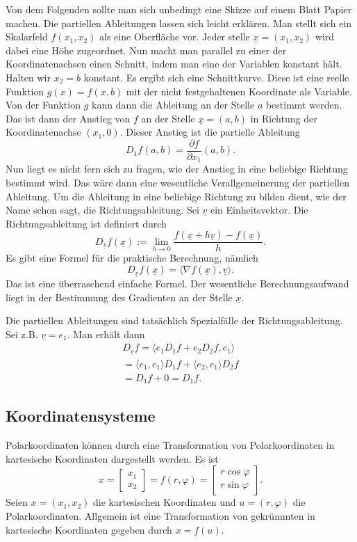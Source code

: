 \documentclass[a4paper,10pt,fleqn,twocolumn,twoside]{article}
\begin{document}
Von dem Folgenden sollte man sich unbedingt eine Skizze auf einem
Blatt Papier machen. Die partiellen Ableitungen lassen sich leicht
erklären. Man stellt sich ein Skalarfeld \(f(x_1,x_2)\) als eine
Oberfläche vor. Jeder stelle \(\underline x=(x_1,x_2)\) wird dabei
eine Höhe zugeordnet. Nun macht man parallel zu einer der
Koordinatenachsen einen Schnitt, indem man eine der Variablen
konstant hält. Halten wir \(x_2=b\) konstant. Es ergibt sich
eine Schnittkurve. Diese ist eine reelle Funktion \(g(x)=f(x,b)\)
mit der nicht festgehaltenen Koordinate als Variable.
Von der Funktion \(g\) kann dann die Ableitung an der Stelle \(a\)
bestimmt werden. Das ist dann der Anstieg von \(f\) an der Stelle
\(\underline x=(a,b)\) in Richtung der Koordinatenachse \((x_1,0)\).
Dieser Anstieg ist die partielle Ableitung
\[D_1 f(a,b) = \frac{\partial f}{\partial x_1}(a,b).\]
%
Nun liegt es nicht fern sich zu fragen, wie der Anstieg in eine
beliebige Richtung bestimmt wird. Das wäre dann eine wesentliche
Verallgemeinerung der partiellen Ableitung.
%
Um die Ableitung in eine beliebige Richtung zu bilden dient, wie der
Name schon sagt, die Richtungsableitung. Sei \(\underline v\)
ein Einheitsvektor. Die Richtungsableitung ist definiert durch
\[D_{\underline v} f(\underline x) := \lim_{h\rightarrow 0}
\frac{f(\underline x+h\underline v)-f(\underline x)}{h}.\]
Es gibt eine Formel für die praktische Berechnung, nämlich
\[D_{\underline v} f(\underline x)
= \langle\nabla f(\underline x),\underline v\rangle.\]
Das ist eine überraschend einfache Formel. Der wesentliche
Berechnungsaufwand liegt in der Bestimmung des Gradienten
an der Stelle \(\underline x\).

Die partiellen Ableitungen sind tatsächlich Spezialfälle der
Richtungsableitung. Sei z.B. \(\underline v=e_1\). Man erhält dann
\begin{gather*}
D_{\underline v} f
= \langle e_1 D_1f+e_2 D_2 f, e_1\rangle\\
= \langle e_1, e_1\rangle D_1f  + \langle e_2, e_1\rangle D_2 f\\
= D_1f+0 = D_1f.
\end{gather*}

\subsection{Koordinatensysteme}

Polarkoordinaten können durch eine Transformation von
Polarkoordinaten in kartesische Koordinaten dargestellt werden.
Es ist
\[x = \begin{bmatrix}
x_1\\ x_2 \end{bmatrix}
= f(r,\varphi) = \begin{bmatrix}
r\cos\varphi\\
r\sin\varphi
\end{bmatrix}.\]
Seien \(x=(x_1,x_2)\) die kartesischen Koordinaten und
\(u=(r,\varphi)\) die Polarkoordinaten. Allgemein ist eine
Transformation von gekrümmten in kartesische Koordinaten gegeben durch
\(x=f(u).\)
\end{document}
